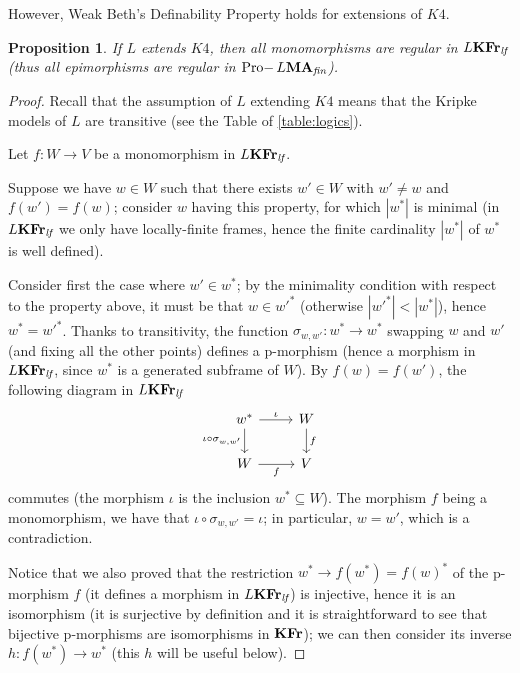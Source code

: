 \documentclass{article}
\newtheorem{prop}{Proposition}
\theoremstyle{definition}
\DeclareMathOperator{\Pro}{Pro-}
\newcommand{\KFr}{\textup{\textbf{KFr}}}
\newcommand{\MA}{\textup{\textbf{MA}}}
\newcommand{\fin}{\textit{fin}}
\newcommand{\lf}{\textit{lf}}
\begin{document}
%
However, Weak Beth's Definability Property holds for extensions of $K4$.
\begin{prop}\label{prop:regmono}
If $L$ extends $K4$, then all monomorphisms are regular in $L\KFr_\lf$ (thus all epimorphisms are regular in $\Pro L\MA_\fin$). 
\end{prop}
\begin{proof}
Recall that the assumption of $L$ extending $K4$ means that the Kripke models of $L$ are transitive (see the Table of \cref{table:logics}).

Let $f \colon W \longrightarrow V$ be a monomorphism in $L\KFr_\lf$.

Suppose we have $w \in W$ such that there exists $w' \in W$ with $w' \neq w$ and $f(w') = f(w)$; consider $w$ having this property, for which $|w^*|$ is minimal (in $L\KFr_\lf$ we only have locally-finite frames, hence the finite cardinality $|w^*|$ of $w^*$ is well defined).

Consider first the case where $w' \in w^*$; by the minimality condition with respect to the property above, it must be that $w \in w'^*$ (otherwise $|w'^*| < |w^*|$), hence $w^*=w'^*$. Thanks to transitivity, the function $\sigma_{w,w'} \colon w^* \longrightarrow w^*$ swapping $w$ and $w'$ (and fixing all the other points) defines a p-morphism (hence a morphism in $L\KFr_\lf$, since $w^*$ is a generated subframe of $W$). By $f(w)=f(w')$, the following diagram in $L\KFr_\lf$
\[\begin{tikzcd}
	{w^*} & W \\
	W & V
	\arrow["\iota", from=1-1, to=1-2]
	\arrow["{\iota \circ \sigma_{w,w'}}"', from=1-1, to=2-1]
	\arrow["f", from=1-2, to=2-2]
	\arrow["f"', from=2-1, to=2-2]
\end{tikzcd}\]
commutes (the morphism $\iota$ is the inclusion $w^* \subseteq W$). The morphism $f$ being a monomorphism, we have that $\iota \circ \sigma_{w,w'} = \iota$; in particular, $w = w'$, which is a contradiction.

Notice that we also proved that
the restriction $w^* \longrightarrow f(w^*) = f(w)^*$ of the p-morphism $f$ (it defines a morphism in $L\KFr_\lf$) is injective, hence it is an isomorphism (it is surjective by definition and it is straightforward to see that bijective p-morphisms are isomorphisms in $\KFr$); we can then consider its inverse $h \colon f(w^*) \longrightarrow w^*$ (this $h$ will be useful below).


\end{proof}
\end{document}
